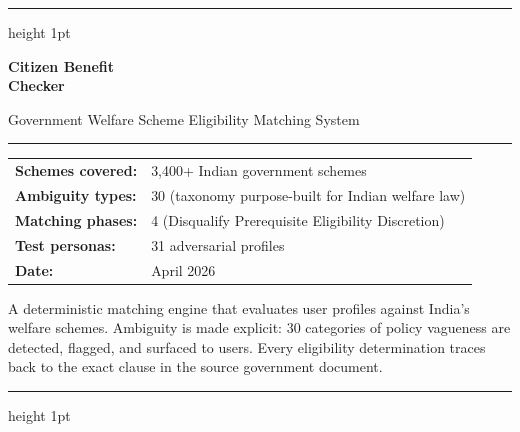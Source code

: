 \documentclass[11pt,a4paper]{report}
\begin{document}
\begin{titlepage}
\thispagestyle{empty}
\vspace*{2cm}

{\color{secondary!40}\hrule height 1pt}
\vspace{0.8cm}

{\fontsize{38}{44}\selectfont\bfseries\color{primary}
Citizen Benefit\\[4pt]Checker
}

\vspace{0.3cm}
{\fontsize{15}{20}\selectfont\color{dark!70}
Government Welfare Scheme Eligibility Matching System
}

\vspace{0.5cm}
{\color{secondary}\rule{3cm}{2pt}}

\vspace{0.8cm}
\begin{tabular}{@{}ll}
\textbf{Schemes covered:}  & 3,400+ Indian government schemes \\
\textbf{Ambiguity types:}  & 30 (taxonomy purpose-built for Indian welfare law) \\
\textbf{Matching phases:}  & 4 (Disqualify \textemdash{} Prerequisite \textemdash{} Eligibility \textemdash{} Discretion) \\
\textbf{Test personas:}    & 31 adversarial profiles \\
\textbf{Date:}             & April 2026 \\
\end{tabular}

\vfill

\begin{callout}
A deterministic matching engine that evaluates user profiles against India's welfare
schemes. Ambiguity is made explicit: 30 categories of policy vagueness are detected,
flagged, and surfaced to users. Every eligibility determination traces back to the
exact clause in the source government document.
\end{callout}

\vspace{1cm}
{\color{secondary!40}\hrule height 1pt}
\end{titlepage}

\setcounter{page}{1}

{\hypersetup{linkcolor=dark}\tableofcontents}
\newpage
\end{document}
